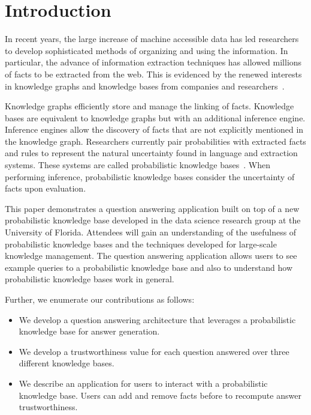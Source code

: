 

\section{Introduction}


In recent years, the large increase of machine accessible data has led researchers
to develop sophisticated methods of organizing and using the information.
In particular, the advance of information extraction techniques has allowed
millions of facts to be extracted from the web.
This is evidenced by the renewed interests in knowledge graphs and knowledge bases
from companies and
researchers~\cite{bellare2013woo,chang2014typed,dong2014knowledge,niu2012deepdive}.

Knowledge graphs efficiently store and manage the linking of facts.
Knowledge bases are equivalent to knowledge graphs but with an additional
inference engine. 
Inference engines allow the discovery of facts that are not explicitly
mentioned in the knowledge graph.
Researchers currently pair probabilities with extracted facts and rules to
represent the natural uncertainty found in language and extraction systems.
These systems are called probabilistic knowledge bases~\cite{chen2014knowledge}.
When performing inference, probabilistic knowledge bases consider the uncertainty
of facts upon evaluation.

This paper demonstrates a question answering application built on top of
a new probabilistic knowledge base developed in the data science research group at the University of Florida.
Attendees will gain an understanding of the usefulness of probabilistic
knowledge bases and the techniques developed for large-scale knowledge
management.
The question answering application allows users to see example queries to a
probabilistic knowledge base and also to understand how probabilistic knowledge bases work in general.

Further, we enumerate our contributions as follows:
\begin{itemize}[noitemsep,topsep=2pt,parsep=2pt,partopsep=0pt,
                leftmargin=10pt,labelindent=0pt,itemindent=0pt]
\item We develop a question answering architecture that leverages a probabilistic knowledge base for answer generation.

\item We develop a trustworthiness value for each question answered over three
  different knowledge bases.

\item We describe an application for users to interact with a probabilistic knowledge
base. Users can add and remove facts before to recompute answer
trustworthiness.
\end{itemize}

